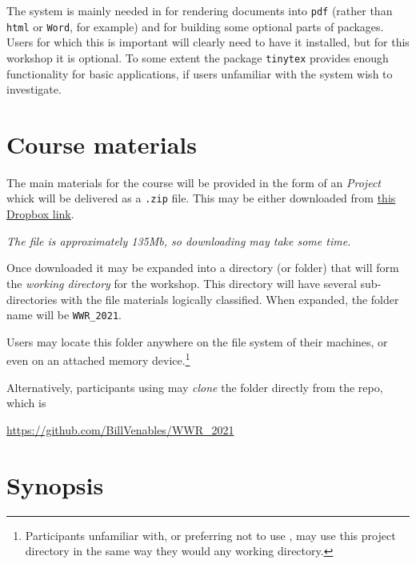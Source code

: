 \documentclass[12pt]{article}
\begin{document}
\begin{description}
  The system is mainly needed in \R for rendering documents into
  \verb|pdf| (rather than \verb|html| or \verb|Word|, for example) and
  for building some optional parts of \R packages.  Users for which
  this is important will clearly need to have it installed, but for
  this workshop it is optional.  To some extent the \R package
  \verb|tinytex| provides enough functionality for basic applications,
  if users unfamiliar with the system wish to investigate.
  


\end{description}

\section{Course materials}
    The main materials for the course will be
  provided in the form of an
  \RStudio \emph{Project} whick will be delivered as a \verb|.zip| file.
  This may be either downloaded from 
  \href{https://www.dropbox.com/s/gwu9hfxtvs1xshh/WWR_2021.zip?dl=0}{this Dropbox link}.
  
  \emph{The file is approximately 135Mb, so downloading may take some time.}  
  
   Once downloaded it may be expanded
  into  a directory (or folder) that will
  form the \emph{working directory} for the workshop.  This directory
  will have several sub-directories with the file materials logically
  classified.  When expanded, the folder name will be \verb|WWR_2021|.

  Users may locate this folder anywhere on the file system of their
  machines, or even on an attached memory
  device.\footnote{Participants unfamiliar with, or preferring not to
    use \RStudio, may use this project directory in the same way they
    would any \R working directory.}

Alternatively, participants using \git may \emph{clone} the folder directly
from the \github repo, which is 

\centerline{\url{https://github.com/BillVenables/WWR_2021}}

\section{Synopsis}
\label{sec:synopsis}
\end{document}
